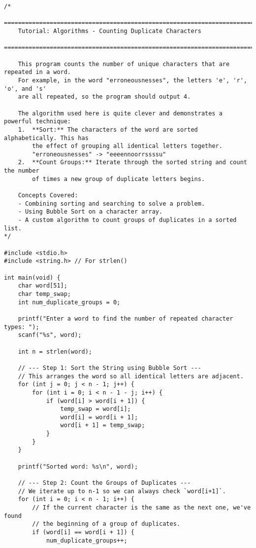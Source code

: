 \documentclass[11pt]{book}
\begin{document}
\begin{verbatim}
/*
    ================================================================================
    Tutorial: Algorithms - Counting Duplicate Characters
    ================================================================================

    This program counts the number of unique characters that are repeated in a word.
    For example, in the word "erroneousnesses", the letters 'e', 'r', 'o', and 's'
    are all repeated, so the program should output 4.

    The algorithm used here is quite clever and demonstrates a powerful technique:
    1.  **Sort:** The characters of the word are sorted alphabetically. This has
        the effect of grouping all identical letters together.
        "erroneousnesses" -> "eeeennoorrssssu"
    2.  **Count Groups:** Iterate through the sorted string and count the number
        of times a new group of duplicate letters begins.

    Concepts Covered:
    - Combining sorting and searching to solve a problem.
    - Using Bubble Sort on a character array.
    - A custom algorithm to count groups of duplicates in a sorted list.
*/

#include <stdio.h>
#include <string.h> // For strlen()

int main(void) {
    char word[51];
    char temp_swap;
    int num_duplicate_groups = 0;

    printf("Enter a word to find the number of repeated character types: ");
    scanf("%s", word);

    int n = strlen(word);

    // --- Step 1: Sort the String using Bubble Sort ---
    // This arranges the word so all identical letters are adjacent.
    for (int j = 0; j < n - 1; j++) {
        for (int i = 0; i < n - 1 - j; i++) {
            if (word[i] > word[i + 1]) {
                temp_swap = word[i];
                word[i] = word[i + 1];
                word[i + 1] = temp_swap;
            }
        }
    }

    printf("Sorted word: %s\n", word);

    // --- Step 2: Count the Groups of Duplicates ---
    // We iterate up to n-1 so we can always check `word[i+1]`.
    for (int i = 0; i < n - 1; i++) {
        // If the current character is the same as the next one, we've found
        // the beginning of a group of duplicates.
        if (word[i] == word[i + 1]) {
            num_duplicate_groups++;


\end{verbatim}
\end{document}
